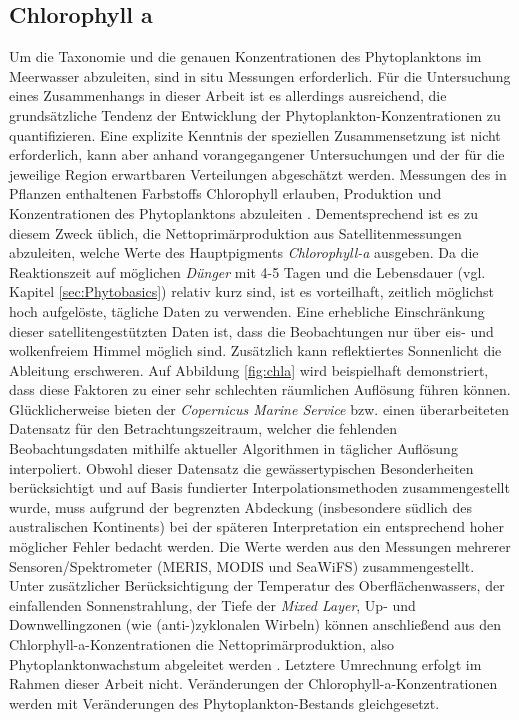 \documentclass[12pt,a4paper,onecolumn,headheight=30pt]{scrartcl}
\begin{document}
\subsection{Chlorophyll a} \label{sec:chla}
Um die Taxonomie und die genauen Konzentrationen des Phytoplanktons im Meerwasser abzuleiten, sind in situ Messungen erforderlich. Für die Untersuchung eines Zusammenhangs in dieser Arbeit ist es allerdings ausreichend, die grundsätzliche Tendenz der Entwicklung der Phytoplankton-Konzentrationen zu quantifizieren. Eine explizite Kenntnis der speziellen Zusammensetzung ist nicht erforderlich, kann aber anhand vorangegangener Untersuchungen und der für die jeweilige Region erwartbaren Verteilungen abgeschätzt werden. Messungen des in Pflanzen enthaltenen Farbstoffs Chlorophyll erlauben, Produktion und Konzentrationen des Phytoplanktons abzuleiten \citep{RYTHER.1957}. Dementsprechend ist es zu diesem Zweck üblich, die Nettoprimärproduktion aus Satellitenmessungen abzuleiten, welche Werte des Hauptpigments \textit{Chlorophyll-a} ausgeben. Da die Reaktionszeit auf möglichen \textit{Dünger} mit 4-5 Tagen und die Lebensdauer (vgl. Kapitel \ref{sec:Phytobasics}) relativ kurz sind, ist es vorteilhaft, zeitlich möglichst hoch aufgelöste, tägliche Daten zu verwenden. Eine erhebliche Einschränkung dieser satellitengestützten Daten ist, dass die Beobachtungen nur über eis- und wolkenfreiem Himmel möglich sind. Zusätzlich kann reflektiertes Sonnenlicht die Ableitung erschweren. Auf Abbildung \ref{fig:chla} wird beispielhaft demonstriert, dass diese Faktoren zu einer sehr schlechten räumlichen Auflösung führen können. Glücklicherweise bieten der \textit{Copernicus Marine Service} bzw. \citet{Saulquin.2019} einen überarbeiteten Datensatz für den Betrachtungszeitraum, welcher die fehlenden Beobachtungsdaten mithilfe aktueller Algorithmen in täglicher Auflösung interpoliert. Obwohl dieser Datensatz die gewässertypischen Besonderheiten berücksichtigt und auf Basis fundierter Interpolationsmethoden zusammengestellt wurde, muss aufgrund der begrenzten Abdeckung (insbesondere südlich des australischen Kontinents) bei der späteren Interpretation ein entsprechend hoher möglicher Fehler bedacht werden. Die Werte werden aus den Messungen mehrerer Sensoren/Spektrometer (MERIS, MODIS und SeaWiFS) zusammengestellt. Unter zusätzlicher Berücksichtigung der Temperatur des Oberflächenwassers, der einfallenden Sonnenstrahlung, der Tiefe der \textit{Mixed Layer}, Up- und Downwellingzonen (wie (anti-)zyklonalen Wirbeln) können anschließend aus den Chlorphyll-a-Konzentrationen die Nettoprimärproduktion, also Phytoplanktonwachstum abgeleitet werden \citep{Falkowski.1998}. Letztere Umrechnung erfolgt im Rahmen dieser Arbeit nicht. Veränderungen der Chlorophyll-a-Konzentrationen werden mit Veränderungen des Phytoplankton-Bestands gleichgesetzt.
\end{document}
